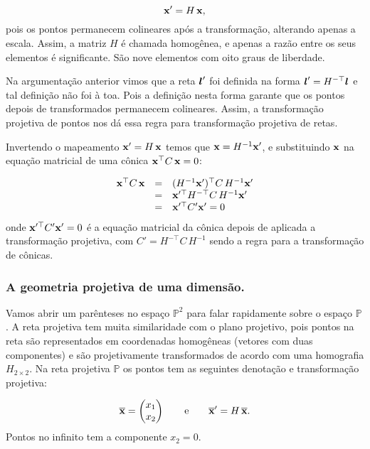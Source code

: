 \begin{equation*}
\mathbf{x}'=H\,\mathbf{x},
\end{equation*}
pois os pontos permanecem colineares após a transformação, alterando apenas a escala. Assim, a matriz $H$ é chamada homogênea, e apenas a razão entre os seus elementos é significante. São nove elementos com oito graus de liberdade.\\


Na argumentação anterior vimos que a reta $\boldsymbol{l}'$ foi definida na forma $\boldsymbol{l}'=H^{-\top}\boldsymbol{l}$ e tal definição não foi à toa. Pois a definição nesta forma garante que os pontos depois de transformados permanecem colineares. Assim, a transformação projetiva de pontos nos dá essa regra para transformação projetiva de retas.\\


Invertendo o mapeamento $\mathbf{x}'=H\,\mathbf{x}$ temos que $\mathbf{x}=H^{-1}\mathbf{x}'$, e substituindo $\mathbf{x}$ na equação matricial de uma cônica $\mathbf{x}^\top C\,\mathbf{x}=0$:

\begin{equation*}
\begin{array}{rcl}
\mathbf{x}^\top C\,\mathbf{x}&=&(H^{-1}\mathbf{x}')^\top C\,H^{-1}\mathbf{x}'\\
&=&\mathbf{x}'^\top H^{-\top}C\,H^{-1}\mathbf{x}'\\
&=&\mathbf{x}'^\top C'\mathbf{x}'=0
\end{array}
\end{equation*}
onde $\mathbf{x}'^\top C'\mathbf{x}'=0$ é a equação matricial da cônica depois de aplicada a transformação projetiva, com $C'=H^{-\top}C\,H^{-1}$ sendo a regra para a transformação de cônicas.


\subsubsection{A geometria projetiva de uma dimensão.}\label{sec.geometria-1D}
Vamos abrir um parênteses no espaço ${\mathbb{P}^2}$ para falar rapidamente sobre o espaço ${\mathbb{P}}$. A reta projetiva tem muita similaridade com o plano projetivo, pois pontos na reta são representados em coordenadas homogêneas (vetores com duas componentes) e são projetivamente transformados de acordo com uma homografia $H_{2\times2}$. Na reta projetiva ${\mathbb{P}}$ os pontos tem as seguintes denotação e transformação projetiva: 

\begin{equation}\label{eq.ponto-homografia-em-P}
\overline{\mathbf{x}}=
\begin{pmatrix}
x_1\\
x_2
\end{pmatrix}
\qquad\text{e}\qquad
\overline{\mathbf{x}}'=H\,\overline{\mathbf{x}}.
\end{equation}
Pontos no infinito tem a componente $x_2=0$.

